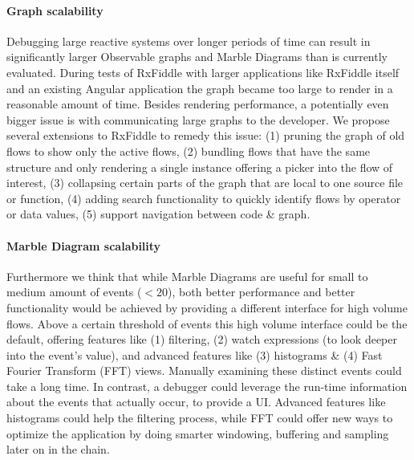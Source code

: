 \paragraph{Graph scalability}
Debugging large reactive systems over longer periods of time can result in significantly larger Observable graphs and Marble Diagrams than is currently evaluated. During tests of RxFiddle with larger applications like RxFiddle itself and an existing Angular application the graph became too large to render in a reasonable amount of time. Besides rendering performance, a potentially even bigger issue is with communicating large graphs to the developer. We propose several extensions to RxFiddle to remedy this issue: (1) pruning the graph of old flows to show only the active flows, (2) bundling flows that have the same structure and only rendering a single instance offering a picker into the flow of interest, (3) collapsing certain parts of the graph that are local to one source file or function, (4) adding search functionality to quickly identify flows by operator or data values, (5) support navigation between code \& graph.

\paragraph{Marble Diagram scalability}
Furthermore we think that while Marble Diagrams are useful for small to medium amount of events ($< 20$), both better performance and better functionality would be achieved by providing a different interface for high volume flows. Above a certain threshold of events this high volume interface could be the default, offering features like (1) filtering, (2) watch expressions (to look deeper into the event's value), and advanced features like (3) histograms \& (4) Fast Fourier Transform (FFT) views. Manually examining these distinct events could take a long time. In contrast, a debugger could leverage the run-time information about the events that actually occur, to provide a UI. Advanced features like histograms could help the filtering process, while FFT could offer new ways to optimize the application by doing smarter windowing, buffering and sampling later on in the chain.

